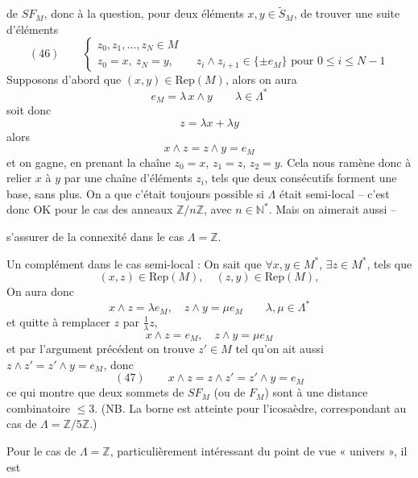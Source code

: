 \documentclass[11pt,a4paper]{article}
\begin{document}
de $SF_M$, donc à la question, pour deux éléments $x, y \in \widetilde{S}_M$, de trouver une suite d'éléments
\[
(46)\qquad \begin{cases} z_0, z_1, \ldots, z_N \in M \\ z_0 = x,\ z_N = y, \qquad z_i \wedge z_{i+1} \in \{\pm e_M\} \text{ pour } 0 \leq i \leq N-1 \end{cases}
\]
Supposons d'abord que $(x,y) \in \mathrm{Rep}(M)$, alors on aura
\[
e_M = \lambda\, x \wedge y \qquad \lambda \in \Lambda^*
\]
soit donc 
\[
z = \lambda x + \lambda y
\]
alors
\[
x \wedge z = z \wedge y = e_M
\]
et on gagne, en prenant la chaîne $z_0 = x$, $z_1 = z$, $z_2 = y$. Cela nous ramène donc à relier $x$ à $y$ par une chaîne d'éléments $z_i$, tels que deux consécutifs forment une base, sans plus. On a  que c'était toujours possible si $\Lambda$ était semi-local -- c'est donc OK pour le cas des anneaux $\mathbb{Z}/n\mathbb{Z}$, avec $n \in \mathbb{N}^*$. Mais \struck{\ill{}} on aimerait aussi -- 

s'assurer de la connexité dans le cas $\Lambda = \mathbb{Z}$.

Un complément dans le cas semi-local : On sait que  $\forall x, y \in M^*$, $\exists z \in M^*$, tels que
\[
(x,z) \in \mathrm{Rep}(M), \quad (z,y) \in \mathrm{Rep}(M),
\]
On aura donc
\[
x \wedge z = \lambda e_M, \quad z \wedge y = \mu e_M \qquad \lambda, \mu \in \Lambda^*
\]
et quitte à remplacer $z$ par $\frac{1}{\lambda} z$, 
\[
x \wedge z = e_M, \quad z \wedge y = \mu e_M
\]
et par l'argument précédent on trouve $z' \in M$ tel qu'on ait aussi $z \wedge z' = z' \wedge y = e_M$, donc
\[
(47)\qquad x \wedge z = z \wedge z' = z' \wedge y = e_M
\]
ce qui montre que deux sommets de $SF_M$ (ou de $F_M$) sont à une distance combinatoire $\leq 3$. (NB. La borne est atteinte pour l'icosaèdre, correspondant au cas de  $\Lambda = \mathbb{Z}/5\mathbb{Z}$.)

Pour le cas de $\Lambda = \mathbb{Z}$, particulièrement intéressant du point de vue « univers », il est
\end{document}
